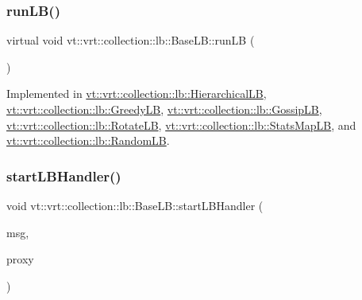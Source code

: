 \mbox{\label{structvt_1_1vrt_1_1collection_1_1lb_1_1_base_l_b_a69a398c54f8129f365171a1189ffcd84}} 
\subsubsection{\texorpdfstring{run\+L\+B()}{runLB()}}
{\footnotesize\ttfamily virtual void vt\+::vrt\+::collection\+::lb\+::\+Base\+L\+B\+::run\+LB (\begin{DoxyParamCaption}{ }\end{DoxyParamCaption})\hspace{0.3cm}{\ttfamily [pure virtual]}}



Implemented in \hyperlink{structvt_1_1vrt_1_1collection_1_1lb_1_1_hierarchical_l_b_a6affae1554d9c0734db0d538b9b26e4d}{vt\+::vrt\+::collection\+::lb\+::\+Hierarchical\+LB}, \hyperlink{structvt_1_1vrt_1_1collection_1_1lb_1_1_greedy_l_b_ab5e726f6fe7aa749ea6e0e2a45171d36}{vt\+::vrt\+::collection\+::lb\+::\+Greedy\+LB}, \hyperlink{structvt_1_1vrt_1_1collection_1_1lb_1_1_gossip_l_b_a06116496c3146be18c56379775f8715d}{vt\+::vrt\+::collection\+::lb\+::\+Gossip\+LB}, \hyperlink{structvt_1_1vrt_1_1collection_1_1lb_1_1_rotate_l_b_a853cb29e5dbe8164ad96a33fade9cc44}{vt\+::vrt\+::collection\+::lb\+::\+Rotate\+LB}, \hyperlink{structvt_1_1vrt_1_1collection_1_1lb_1_1_stats_map_l_b_a20a7bd354dcaca4393c66034be3b4083}{vt\+::vrt\+::collection\+::lb\+::\+Stats\+Map\+LB}, and \hyperlink{structvt_1_1vrt_1_1collection_1_1lb_1_1_random_l_b_a7354965590d0ab010841a2a9086ce7e8}{vt\+::vrt\+::collection\+::lb\+::\+Random\+LB}.

\mbox{\label{structvt_1_1vrt_1_1collection_1_1lb_1_1_base_l_b_a26d684f9f07e7635886b12d0235e081e}} 
\subsubsection{\texorpdfstring{start\+L\+B\+Handler()}{startLBHandler()}}
{\footnotesize\ttfamily void vt\+::vrt\+::collection\+::lb\+::\+Base\+L\+B\+::start\+L\+B\+Handler (\begin{DoxyParamCaption}\item[{\hyperlink{structvt_1_1vrt_1_1collection_1_1balance_1_1_start_l_b_msg}{balance\+::\+Start\+L\+B\+Msg} $\ast$}]{msg,  }\item[{\hyperlink{structvt_1_1objgroup_1_1proxy_1_1_proxy}{objgroup\+::proxy\+::\+Proxy}$<$ \hyperlink{structvt_1_1vrt_1_1collection_1_1lb_1_1_base_l_b}{Base\+LB} $>$}]{proxy }\end{DoxyParamCaption})}

